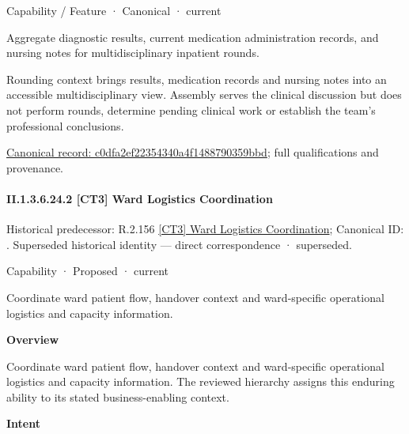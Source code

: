 \label{element:c0dfa2ef22354340a4f1488790359bbd}
{\small Capability / Feature · Canonical · current}\par

Aggregate diagnostic results, current medication administration records, and nursing notes for multidisciplinary inpatient rounds.



Rounding context brings results, medication records and nursing notes into an accessible multidisciplinary view. Assembly serves the clinical discussion but does not perform rounds, determine pending clinical work or establish the team's professional conclusions.


{\footnotesize \href{../../../../continuum/strategy/capability/feature/c0dfa2ef22354340a4f1488790359bbd.md}{Canonical record: c0dfa2ef22354340a4f1488790359bbd}; full qualifications and provenance.}\par
\paragraph*{II.1.3.6.24.2 [CT3] Ward Logistics Coordination}
\label{navigation:II.1.3.6.24.2}

{\small Historical predecessor: R.2.156 \hyperref[element:8a9dcc3b5f0143458ec71bc188a56020]{[CT3] Ward Logistics Coordination}; Canonical ID: \texttt{}. Superseded historical identity — direct correspondence · superseded.}\par
\label{element:3249647f7b9846c899f982ab339c81f9}
{\small Capability · Proposed · current}\par

Coordinate ward patient flow, handover context and ward-specific operational logistics and capacity information.



\textbf{Overview}



Coordinate ward patient flow, handover context and ward-specific operational logistics and capacity information. The reviewed hierarchy assigns this enduring ability to its stated business-enabling context.



\textbf{Intent}



